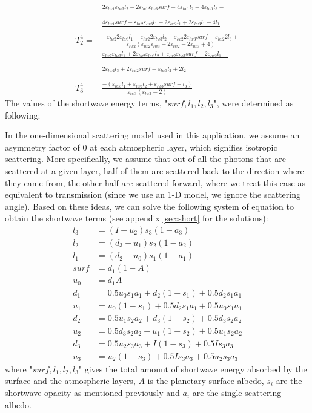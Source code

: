 \documentclass[a4paper,12pt]{article}
\begin{document}
\begin{align*}
    &\frac{2\varepsilon_{lw1}\varepsilon_{lw3}l_2 - 2\varepsilon_{lw1}\varepsilon_{lw3}surf - 4\varepsilon_{lw1}l_2 - 4\varepsilon_{lw1}l_3 -}{}\\
    &\frac{4\varepsilon_{lw1}surf - \varepsilon_{lw2}\varepsilon_{lw3}l_1 + 2\varepsilon_{lw2}l_1 + 2\varepsilon_{lw3}l_1 -4l_1}{}\\
    T_2^4 =& \frac{-\varepsilon_{lw2}2\varepsilon_{lw3}l_1 - \varepsilon_{lw2}2\varepsilon_{lw3}l_2 - \varepsilon_{lw2}2\varepsilon_{lw3}surf - \varepsilon_{lw2}2l_3 + }{\varepsilon_{lw2}(\varepsilon_{lw2}\varepsilon_{lw3} - 2\varepsilon_{lw2} - 2\varepsilon_{lw3} + 4)}\\
    &\frac{\varepsilon_{lw2}\varepsilon_{lw3}l_1 + 2\varepsilon_{lw2}\varepsilon_{lw3}l_2 + \varepsilon_{lw2}\varepsilon_{lw3}surf + 2\varepsilon_{lw2}l_1 +}{}\\
    &\frac{2\varepsilon_{lw2}l_3 + 2\varepsilon_{lw2}surf - \varepsilon_{lw3}l_2 + 2l_2}{}\\
    T_3^4 = &\frac{-(\varepsilon_{lw3}l_1 + \varepsilon_{lw3}l_2 + \varepsilon_{lw3}surf + l_3)}{\varepsilon_{lw3}(\varepsilon_{lw3} - 2)}
\end{align*}
The values of the shortwave energy terms, "$surf, l_1, l_2, l_3$", were determined as following:

In the one-dimensional scattering model used in this application, we assume an asymmetry factor of 0 at each atmospheric layer, which signifies isotropic scattering. More specifically, we assume that out of all the photons that are scattered at a given layer, half of them are scattered back to the direction where they came from, the other half are scattered forward, where we treat this case as equivalent to transmission (since we use an 1-D model, we ignore the scattering angle). Based on these ideas, we can solve the following system of equation to obtain the shortwave terms (see appendix \ref{sec:short} for the solutions):
\begin{align*}
    l_3 &= (I+u_2)s_3(1-a_3)\\
l_2 &= (d_3+u_1)s_2(1-a_2)\\
l_1 &= (d_2+u_0)s_1(1-a_1)\\
surf &= d_1(1-A)\\
u_0&= d_1A\\
d_1&= 0.5u_0s_1a_1+d_2(1-s_1)+0.5d_2s_1a_1\\
u_1&= u_0(1-s_1)+0.5d_2s_1a_1+0.5u_0s_1a_1\\
d_2 &= 0.5u_1s_2a_2+d_3(1-s_2)+0.5d_3s_2a_2\\
u_2 &= 0.5d_3s_2a_2+u_1(1-s_2)+0.5u_1s_2a_2\\
d_3&= 0.5u_2s_3a_3+I(1-s_3)+0.5Is_3a_3\\
u_3 &= u_2(1-s_3)+0.5Is_3a_3+0.5u_2s_3a_3
\end{align*}
where "$surf,l_1, l_2, l_3$" gives the total amount of shortwave energy absorbed by the surface and the atmospheric layers, $A$ is the planetary surface albedo, $s_i$ are the shortwave opacity as mentioned previously and $a_i$ are the single scattering albedo. 
\end{document}
